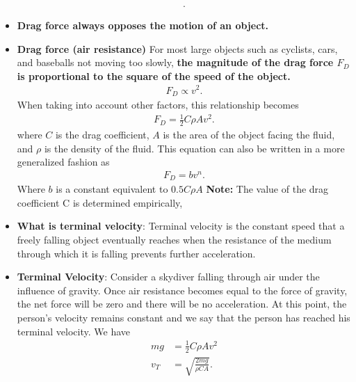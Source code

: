 \documentclass{report}
\begin{document}
\begin{itemize}
\begin{align*}
                    .\end{align*}
                \item \textbf{Drag force always opposes the motion of an object.}
                \item \textbf{Drag force (air resistance)} For most large objects such as cyclists, cars, and baseballs not moving too slowly, \textbf{the magnitude of the drag force $F_{D}$ is proportional to the square of the speed of the object.}
                    \begin{align*}
                        F_{D} \propto v^{2}
                    .\end{align*}
                     When taking into account other factors, this relationship becomes
                     \begin{align*}
                         F_{D} = \frac{1}{2}C\rho Av^{2}
                     .\end{align*}
                     where $C$ is the drag coefficient, $A$ is the area of the object facing the fluid, and $\rho$ is the density of the fluid.
                     \bigbreak \noindent 
                     This equation can also be written in a more generalized fashion as
                     \begin{align*}
                         F_{D} = bv^{n}
                     .\end{align*}
                     Where $b$ is a constant equivalent to $0.5C\rho A$
                     \bigbreak \noindent 
                     \textbf{Note:} The value of the drag coefficient C is determined empirically,
                \item \textbf{What is terminal velocity}: Terminal velocity is the constant speed that a freely falling object eventually reaches when the resistance of the medium through which it is falling prevents further acceleration.
                \item \textbf{Terminal Velocity}: Consider a skydiver falling through air under the influence of gravity. Once air resistance becomes equal to the force of gravity, the net force will be zero and there will be no acceleration. At this point, the person’s velocity remains constant and we say that the person has reached his terminal velocity. We have
                    \begin{align*}
                        mg&=\frac{1}{2}C\rho Av^{2} \\
                        v_{T}&=\sqrt{\frac{2mg}{\rho CA}}
                    .\end{align*}

\end{itemize}
\end{document}
